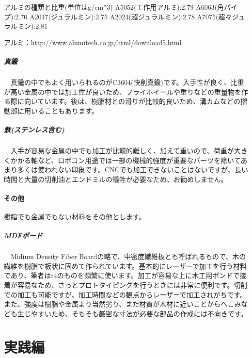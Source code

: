 \documentclass[onecolumn]{preport}
\begin{document}
アルミの種類と比重(単位はg/cm\verb|^|3)
A5052(工作用アルミ):2.79
A6063(角パイプ):2.70
A2017(ジュラルミン):2.75
A2024(超ジュラルミン):2.78
A7075(超々ジュラルミン):2.81

アルミ：http://www.alumitech.co.jp/html/download5.html

\subsubsection{真鍮}

　真鍮の中でもよく用いられるのがC3604(快削真鍮)です。入手性が良く、比重が高い金属の中では加工性が良いため、フライホイールや重りなどの重量物を作る際に向いています。後は、樹脂材との滑りが比較的良いため、溝カムなどの摺動部に用いることもあります。
　
\subsubsection{鉄(ステンレス含む)}

　入手が容易な金属の中でも加工が比較的難しく、加えて重いので、荷重が大きくかかる軸など、ロボコン用途では一部の機械的強度が重要なパーツを除いてあまり多くは使われない印象です。CNCでも加工できないことはないですが、長い時間と大量の切削油とエンドミルの犠牲が必要なため、お勧めしません。

\subsection{その他}

 樹脂でも金属でもない材料をその他とします。

\subsubsection{MDFボード}

　Midium Density Fiber Boardの略で、中密度繊維板とも呼ばれるもので、木の繊維を樹脂で板状に固めて作られています。基本的にレーザーで加工を行う材料であり、筆者はt4のものを頻繁に使います。加工が容易な上に木工用ボンドで接着が容易なため、さっとプロトタイピングを行うときには非常に便利です。切削での加工も可能ですが、加工時間などの観点からレーザーで加工されがちです。また、強度は樹脂や金属より当然劣り、また材質が木材に近いことからへこみなども生じやすいため、そもそも厳密な寸法が必要な部品の作成には不向きです。
         
\part{実践編}
\end{document}

